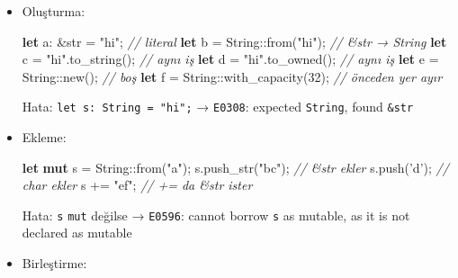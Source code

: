 \documentclass[12pt,a4paper]{article}
\newenvironment{Shaded}{}{}
\newcommand{\CharTok}[1]{\textcolor[rgb]{0.25,0.44,0.63}{#1}}
\newcommand{\CommentTok}[1]{\textcolor[rgb]{0.38,0.63,0.69}{\textit{#1}}}
\newcommand{\DataTypeTok}[1]{\textcolor[rgb]{0.56,0.13,0.00}{#1}}
\newcommand{\DecValTok}[1]{\textcolor[rgb]{0.25,0.63,0.44}{#1}}
\newcommand{\FunctionTok}[1]{\textcolor[rgb]{0.02,0.16,0.49}{#1}}
\newcommand{\KeywordTok}[1]{\textcolor[rgb]{0.00,0.44,0.13}{\textbf{#1}}}
\newcommand{\NormalTok}[1]{#1}
\newcommand{\OperatorTok}[1]{\textcolor[rgb]{0.40,0.40,0.40}{#1}}
\newcommand{\StringTok}[1]{\textcolor[rgb]{0.25,0.44,0.63}{#1}}
\begin{document}
\begin{itemize}
\item
  Oluşturma:

\begin{Shaded}
\begin{Highlighting}[]
\KeywordTok{let}\NormalTok{ a}\OperatorTok{:} \OperatorTok{\&}\DataTypeTok{str} \OperatorTok{=} \StringTok{"hi"}\OperatorTok{;}                 \CommentTok{// literal}
\KeywordTok{let}\NormalTok{ b }\OperatorTok{=} \DataTypeTok{String}\OperatorTok{::}\FunctionTok{from}\OperatorTok{(}\StringTok{"hi"}\OperatorTok{);}         \CommentTok{// \&str → String}
\KeywordTok{let}\NormalTok{ c }\OperatorTok{=} \StringTok{"hi"}\OperatorTok{.}\FunctionTok{to\_string}\OperatorTok{();}           \CommentTok{// aynı iş}
\KeywordTok{let}\NormalTok{ d }\OperatorTok{=} \StringTok{"hi"}\OperatorTok{.}\FunctionTok{to\_owned}\OperatorTok{();}            \CommentTok{// aynı iş}
\KeywordTok{let}\NormalTok{ e }\OperatorTok{=} \DataTypeTok{String}\OperatorTok{::}\FunctionTok{new}\OperatorTok{();}              \CommentTok{// boş}
\KeywordTok{let}\NormalTok{ f }\OperatorTok{=} \DataTypeTok{String}\OperatorTok{::}\FunctionTok{with\_capacity}\OperatorTok{(}\DecValTok{32}\OperatorTok{);}  \CommentTok{// önceden yer ayır}
\end{Highlighting}
\end{Shaded}


  Hata: \texttt{let\ s:\ String\ =\ "hi";} → \texttt{E0308}: expected \texttt{String}, found \texttt{\&str}
\item
  Ekleme:

\begin{Shaded}
\begin{Highlighting}[]
\KeywordTok{let} \KeywordTok{mut}\NormalTok{ s }\OperatorTok{=} \DataTypeTok{String}\OperatorTok{::}\FunctionTok{from}\OperatorTok{(}\StringTok{"a"}\OperatorTok{);}
\NormalTok{s}\OperatorTok{.}\FunctionTok{push\_str}\OperatorTok{(}\StringTok{"bc"}\OperatorTok{);}   \CommentTok{// \&str ekler}
\NormalTok{s}\OperatorTok{.}\FunctionTok{push}\OperatorTok{(}\CharTok{'d'}\OperatorTok{);}        \CommentTok{// char ekler}
\NormalTok{s }\OperatorTok{+=} \StringTok{"ef"}\OperatorTok{;}          \CommentTok{// += da \&str ister}
\end{Highlighting}
\end{Shaded}


  Hata: \texttt{s} \texttt{mut} değilse → \texttt{E0596}: cannot borrow \texttt{s} as mutable, as it is not declared as mutable
\item
  Birleştirme:


\end{itemize}
\end{document}

